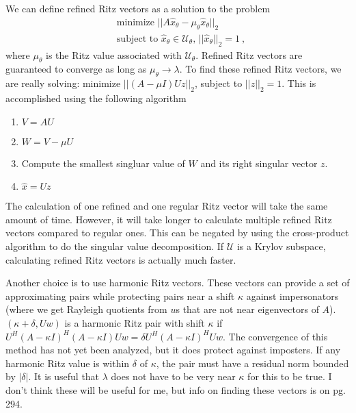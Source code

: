 \documentclass[12pt,twoside]{article}
\newcommand{\evecs}{eigenvectors }
\newcommand{\cl}[1]{\ensuremath{\mathcal{#1}}}
\begin{document}
We can define refined Ritz vectors as a solution to the problem 
\begin{align}
  &\text{minimize } ||A\hat{x}_\theta - \mu_\theta\hat{x}_\theta||_2 \\
  &\text{subject to } \hat{x}_\theta \in \cl{U}_\theta\text{, } ||\hat{x}_\theta||_2 = 1 \:,
\end{align}
where $\mu_\theta$ is the Ritz value associated with $\cl{U}_\theta$. Refined Ritz vectors are guaranteed to converge as long as $\mu_\theta \to \lambda$. To find these refined Ritz vectors, we are really solving: minimize $||(A - \mu I)Uz||_2$, subject to $||z||_2 = 1$. This is accomplished using the following algorithm
\begin{enumerate}
  \item $V = AU$
  \item $W = V - \mu U$
  \item Compute the smallest singluar value of $W$ and its right singular vector $z$. 
  \item $\hat{x} = Uz$
\end{enumerate}
The calculation of one refined and one regular Ritz vector will take the same amount of time. However, it will take longer to calculate multiple refined Ritz vectors compared to regular ones. This can be negated by using the cross-product algorithm to do the singular value decomposition. If $\cl{U}$ is a Krylov subspace, calculating refined Ritz vectors is actually much faster. 

Another choice is to use harmonic Ritz vectors. These vectors can provide a set of approximating pairs while protecting pairs near a shift $\kappa$ against impersonators (where we get Rayleigh quotients from $u$s that are not near \evecs of $A$). $(\kappa + \delta, Uw)$ is a harmonic Ritz pair with shift $\kappa$ if $U^H(A - \kappa I)^H (A-\kappa I) Uw = \delta U^H(A - \kappa I)^H Uw$.  The convergence of this method has not yet been analyzed, but it does protect against imposters. If any harmonic Ritz value is within $\delta$ of $\kappa$, the pair must have a residual norm bounded by $|\delta|$. It is useful that $\lambda$ does not have to be very near $\kappa$ for this to be true. I don't think these will be useful for me, but info on finding these vectors is on pg. 294. 
\end{document}
